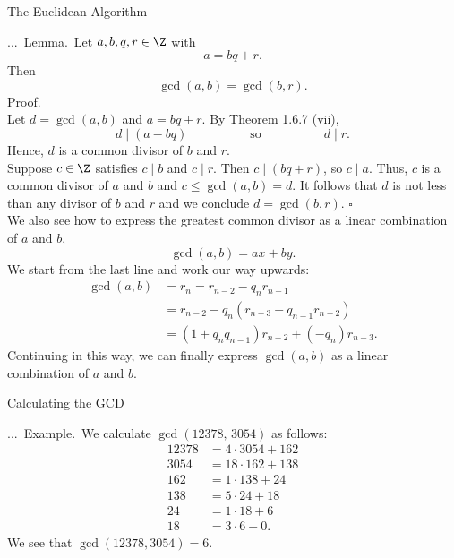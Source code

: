 \documentclass[smaller,hyperref={CJKbookmarks=true}]{beamer}
\newenvironment{PROOF}{{\noindent\!\sf\alert{Proof.}}\\}{\hfill$\square$\\}
\newcounter{zhuo}[subsection]
\renewcommand{\thezhuo}{\thesection.\thesubsection.\arabic{zhuo}}
\newenvironment{EXAMPLE}{\stepcounter{zhuo}\alert{\!\thezhuo.~Example.\,}}{}
\newenvironment{LEMMA}{\stepcounter{zhuo}\alert{\thezhuo.~Lemma.\,}}{}
\begin{document}
\begin{frame}{The Euclidean Algorithm}
\begin{spacing}{1.05}
\begin{LEMMA}
Let $a,b,q,r\in\Z$ with
\[a=bq+r.\]
Then
\[\gcd(a,b)=\gcd(b,r).\]
\end{LEMMA}
\begin{PROOF}
Let $d=\gcd(a,b)$ and $a=bq+r$. By Theorem 1.6.7 (vii),
\[d\mid (a-bq)\qquad\qquad\quad
\text{so}\qquad\qquad\quad
d\mid r.\]
Hence, $d$ is a common divisor of $b$ and $r$.\\[5pt]
Suppose $c\in\Z$ satisfies $c\mid b$ and $c\mid r$. Then $c\mid(bq+r)$, so $c\mid a$. Thus, $c$ is a common divisor of $a$ and $b$ and $c\leq\gcd(a,b)=d$. It follows that $d$ is not less than any divisor of $b$ and $r$ and we conclude $d=\gcd(b,r)$.
\end{PROOF}
\newpage
\vspace*{10pt}
We also see how to express the greatest common divisor as a linear
combination of $a$ and $b$,
\[\gcd(a,b)=ax+by.\]
We start from the last line and work our way upwards:
\begin{equation*}
  \begin{split}
     \gcd(a,b) &=r_n=r_{n-2}-q_nr_{n-1} \\
       &=r_{n-2}-q_n(r_{n-3}-q_{n-1}r_{n-2}) \\
       &=(1+q_nq_{n-1})r_{n-2}+(-q_n)r_{n-3}.
  \end{split}
\end{equation*}
Continuing in this way, we can finally express $\gcd(a,b)$ as a linear combination of $a$ and $b$.
\end{spacing}
\end{frame}
\begin{frame}[c]{Calculating the GCD}
\begin{spacing}{1.2}
\begin{EXAMPLE}
We calculate $\gcd(12378,\,3054)$ as follows:
\begin{align*}
  12378 &=4\cdot3054+162 \\
  3054 &=18\cdot162+138 \\
  162 &=1\cdot138+24 \\
  138 &=5\cdot24+18 \\
  24 &=1\cdot18+6 \\
  18 &=3\cdot6+0.
\end{align*}
We see that $\gcd(12378,3054)=6$.
\end{EXAMPLE}
\end{spacing}
\end{frame}
\end{document}
